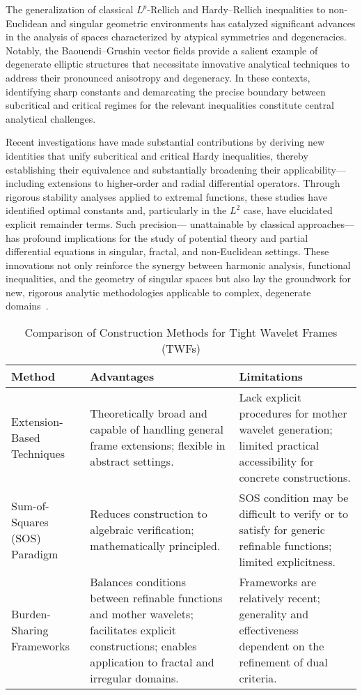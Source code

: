\documentclass[11pt]{article}
\begin{document}
The generalization of classical $L^p$-Rellich and Hardy--Rellich inequalities to non-Euclidean and singular geometric environments has catalyzed significant advances in the analysis of spaces characterized by atypical symmetries and degeneracies. Notably, the Baouendi--Grushin vector fields provide a salient example of degenerate elliptic structures that necessitate innovative analytical techniques to address their pronounced anisotropy and degeneracy. In these contexts, identifying sharp constants and demarcating the precise boundary between subcritical and critical regimes for the relevant inequalities constitute central analytical challenges.

Recent investigations have made substantial contributions by deriving new identities that unify subcritical and critical Hardy inequalities, thereby establishing their equivalence and substantially broadening their applicability—including extensions to higher-order and radial differential operators. Through rigorous stability analyses applied to extremal functions, these studies have identified optimal constants and, particularly in the $L^2$ case, have elucidated explicit remainder terms. Such precision— unattainable by classical approaches—has profound implications for the study of potential theory and partial differential equations in singular, fractal, and non-Euclidean settings. These innovations not only reinforce the synergy between harmonic analysis, functional inequalities, and the geometry of singular spaces but also lay the groundwork for new, rigorous analytic methodologies applicable to complex, degenerate domains~\cite{ref105}.

\begin{table}[h!]
\centering
\caption{Comparison of Construction Methods for Tight Wavelet Frames (TWFs)}
\label{tab:TWF_methods_comparison}
\begin{tabular}{|l|p{5cm}|p{5cm}|}
\hline
\textbf{Method} & \textbf{Advantages} & \textbf{Limitations} \\
\hline
Extension-Based Techniques & Theoretically broad and capable of handling general frame extensions; flexible in abstract settings. & Lack explicit procedures for mother wavelet generation; limited practical accessibility for concrete constructions. \\
\hline
Sum-of-Squares (SOS) Paradigm & Reduces construction to algebraic verification; mathematically principled. & SOS condition may be difficult to verify or to satisfy for generic refinable functions; limited explicitness. \\
\hline
Burden-Sharing Frameworks & Balances conditions between refinable functions and mother wavelets; facilitates explicit constructions; enables application to fractal and irregular domains. & Frameworks are relatively recent; generality and effectiveness dependent on the refinement of dual criteria. \\
\hline
\end{tabular}
\end{table}
\end{document}
